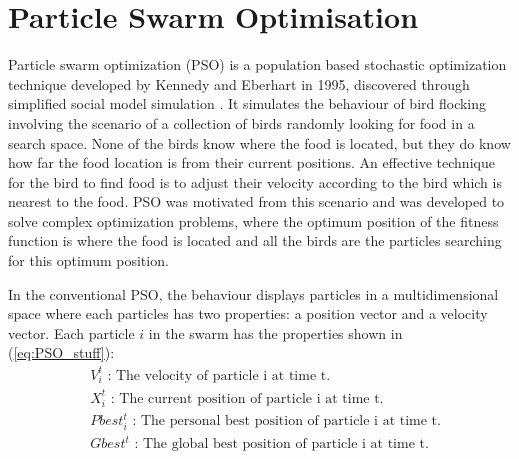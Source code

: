 \documentclass{pdfmx4020}
\begin{document}
  \section{Particle Swarm Optimisation} %
  \label{sec:particle_swarm_optimisation}


  Particle swarm optimization (PSO) is a population based  stochastic optimization technique developed by Kennedy and  Eberhart in 1995, discovered through simplified social model simulation \cite{pso,pso2,pso3,pso4}. It simulates the behaviour of bird flocking involving the scenario of a collection of birds randomly looking for food in a search space. None of the birds know where the food is located, but they do know how far the food location is from their current positions. An effective technique for the bird to find food is to adjust their velocity according to the bird which is nearest to the food. PSO was motivated from this scenario and was developed to solve complex optimization problems, where the optimum position of the fitness function is where the food is located and all the birds are the particles searching for this optimum position. 

  In the conventional PSO, the behaviour displays particles in a multidimensional space where each particles has two properties: a position vector and a velocity vector. Each particle $i$ in the swarm has the properties shown in (\ref{eq:PSO_stuff}):
    \begin{equation} \label{eq:PSO_stuff}
      \begin{split}
        & V_i^t \text{ : The velocity of particle i at time t.} \\
        & X_i^t \text{ : The current position of particle i at time t.} \\
        & Pbest_i^t \text{ : The personal best position of particle i at time t.} \\
        & Gbest^t \text{ : The global best position of particle i at time t.} \\
      \end{split}
    \end{equation}
\end{document}
